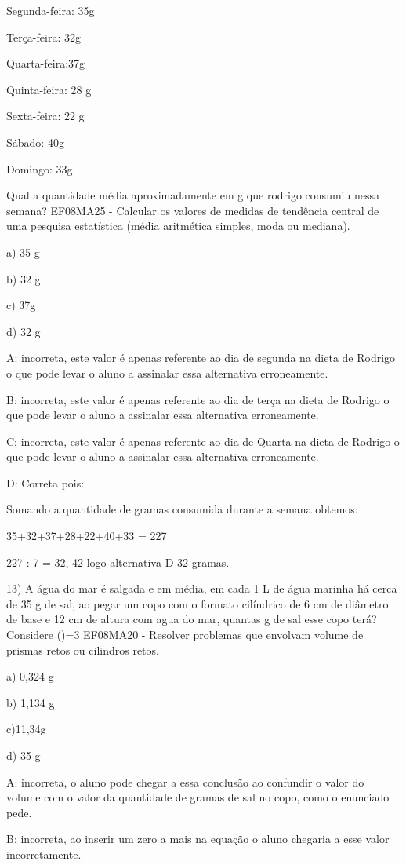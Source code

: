 Segunda-feira: 35g

Terça-feira: 32g

Quarta-feira:37g

Quinta-feira: 28 g

Sexta-feira: 22 g

Sábado: 40g

Domingo: 33g

Qual a quantidade média aproximadamente em g que rodrigo consumiu nessa
semana? EF08MA25 - Calcular os valores de medidas de tendência central
de uma pesquisa estatística (média aritmética simples, moda ou mediana).

a) 35 g

b) 32 g

c) 37g

d) 32 g

A: incorreta, este valor é apenas referente ao dia de segunda na dieta
de Rodrigo o que pode levar o aluno a assinalar essa alternativa
erroneamente.

B: incorreta, este valor é apenas referente ao dia de terça na dieta de
Rodrigo o que pode levar o aluno a assinalar essa alternativa
erroneamente.

C: incorreta, este valor é apenas referente ao dia de Quarta na dieta de
Rodrigo o que pode levar o aluno a assinalar essa alternativa
erroneamente.

D: Correta pois:

Somando a quantidade de gramas consumida durante a semana obtemos:

35+32+37+28+22+40+33 = 227

227 : 7 = 32, 42 logo alternativa D 32 gramas.

13) A água do mar é salgada e em média, em cada 1 L de água marinha há
cerca de 35 g de sal, ao pegar um copo com o formato cilíndrico de 6 cm
de diâmetro de base e 12 cm de altura com agua do mar, quantas g de sal
esse copo terá? Considere (\Pi)=3 EF08MA20 - Resolver problemas que
envolvam volume de prismas retos ou cilindros retos.

a) 0,324 g

b) 1,134 g

c)11,34g

d) 35 g

A: incorreta, o aluno pode chegar a essa conclusão ao confundir o valor
do volume com o valor da quantidade de gramas de sal no copo, como o
enunciado pede.

B: incorreta, ao inserir um zero a mais na equação o aluno chegaria a
esse valor incorretamente.

